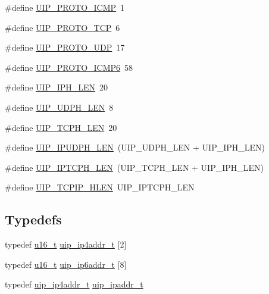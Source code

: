\begin{DoxyCompactItemize}
$$\#define \hyperlink{group__uip_ga359951eecd80541c2101f628a9da9146}{UIP\_\-PROTO\_\-ICMP}~1
\item 
\#define \hyperlink{group__uip_ga517c770991459cc62dc009c0d3875c6a}{UIP\_\-PROTO\_\-TCP}~6
\item 
\#define \hyperlink{group__uip_gaf72d7b9a737707dcfb2c41fec2b6792e}{UIP\_\-PROTO\_\-UDP}~17
\item 
\#define \hyperlink{group__uip_gaad0321f4c570f9983c6de81ece3ddc20}{UIP\_\-PROTO\_\-ICMP6}~58
\item 
\#define \hyperlink{group__uip_ga6bc12c6c7b56f73ce5d57abfdcdc6eb5}{UIP\_\-IPH\_\-LEN}~20
\item 
\#define \hyperlink{group__uip_gab948296aea6b6b3aa1f156799c4d479c}{UIP\_\-UDPH\_\-LEN}~8
\item 
\#define \hyperlink{group__uip_ga17d111686f98e4c09db73a770ac3f1a4}{UIP\_\-TCPH\_\-LEN}~20
\item 
\#define \hyperlink{group__uip_ga6f2b90c597ec23f39ec716ccec11233c}{UIP\_\-IPUDPH\_\-LEN}~(UIP\_\-UDPH\_\-LEN + UIP\_\-IPH\_\-LEN)
\item 
\#define \hyperlink{group__uip_ga15f2617f7dc1713f9d10282125c6027b}{UIP\_\-IPTCPH\_\-LEN}~(UIP\_\-TCPH\_\-LEN + UIP\_\-IPH\_\-LEN)
\item 
\#define \hyperlink{group__uip_gaee37386b2ab828787c05227eb109def7}{UIP\_\-TCPIP\_\-HLEN}~UIP\_\-IPTCPH\_\-LEN
\end{DoxyCompactItemize}
\subsection*{Typedefs}
\begin{DoxyCompactItemize}
\item 
typedef \hyperlink{group__uipfw_ga77570ac4fcab86864fa1916e55676da2}{u16\_\-t} \hyperlink{group__uip_ga20ceef9d0868d391c2f33041b02cb1f1}{uip\_\-ip4addr\_\-t} \mbox{[}2\mbox{]}
\item 
typedef \hyperlink{group__uipfw_ga77570ac4fcab86864fa1916e55676da2}{u16\_\-t} \hyperlink{group__uip_ga9ebb4dac683163840eab9c6c41ad61f7}{uip\_\-ip6addr\_\-t} \mbox{[}8\mbox{]}
\item 
typedef \hyperlink{group__uip_ga20ceef9d0868d391c2f33041b02cb1f1}{uip\_\-ip4addr\_\-t} \hyperlink{group__uip_ga1ef35301f43a5bbb9f89f07b5a36b9a0}{uip\_\-ipaddr\_\-t}
\end{DoxyCompactItemize}
